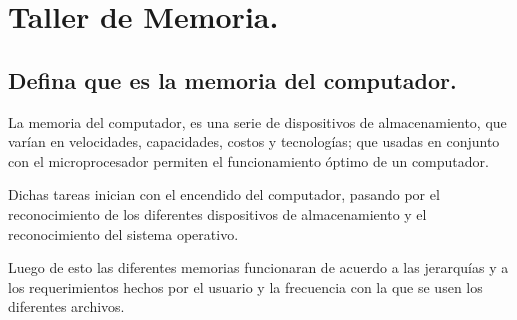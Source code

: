 \documentclass{article}
\begin{document}
\newpage
 

\section{Taller de Memoria.} \label{contenido}

\subsection{Defina que es la memoria del computador.}
\vspace{0.5cm}
\noindent
La memoria del computador, es una serie de dispositivos de almacenamiento, que varían en velocidades, capacidades, costos y tecnologías; que usadas en conjunto con el microprocesador permiten el funcionamiento óptimo de un computador. 

\vspace{0.5cm}
\noindent
Dichas tareas inician con el encendido del computador, pasando por el reconocimiento de los diferentes dispositivos de almacenamiento y el reconocimiento del sistema operativo.

\vspace{0.5cm}
\noindent
Luego de esto las diferentes memorias funcionaran de acuerdo a las jerarquías y a los requerimientos hechos por el usuario y la frecuencia con la que se usen los diferentes archivos. 
\end{document}
